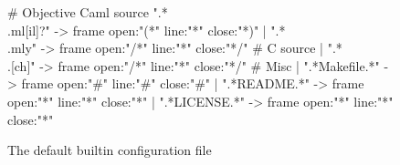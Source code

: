 \documentclass{vs-article}
\begin{document}
\begin{figure}
\begin{center}
\begin{boxedverbatim}
# Objective Caml source 
  ".*\\.ml[il]?" -> frame open:"(*" line:"*" close:"*)"
| ".*\\.mly"     -> frame open:"/*" line:"*" close:"*/"
# C source
| ".*\\.[ch]"    -> frame open:"/*" line:"*" close:"*/"
# Misc
| ".*Makefile.*" -> frame open:"#"  line:"#" close:"#"
| ".*README.*"   -> frame open:"*"  line:"*" close:"*"
| ".*LICENSE.*"  -> frame open:"*"  line:"*" close:"*"
\end{boxedverbatim}
\end{center}
  \caption{The default builtin configuration file}
  \label{figure:config}
\end{figure}
\end{document}
